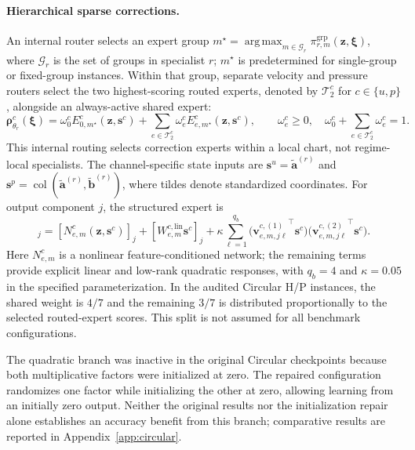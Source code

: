 \paragraph{Hierarchical sparse corrections.}
An internal router selects an expert group
$m^\star=\operatorname*{arg\,max}_{m\in\mathcal G_r}
\pi_{r,m}^{\mathrm{grp}}(\bm z,\bm\xi)$,
where $\mathcal G_r$ is the set of groups in specialist $r$;
$m^\star$ is predetermined for single-group or fixed-group instances.
Within that group, separate velocity and pressure routers select the
two highest-scoring routed experts, denoted by $\mathcal T_2^c$ for
$c\in\{u,p\}$, alongside an always-active shared expert:
\begin{equation}
  \bm\rho^c_{\theta_r}(\bm\xi)
  =\omega_0^c E_{0,m^\star}^c(\bm z,\bm s^c)
   +\sum_{e\in\mathcal T_2^c}
       \omega_e^c E_{e,m^\star}^c(\bm z,\bm s^c),
  \qquad
  \omega_e^c\geq0,\quad
  \omega_0^c+\sum_{e\in\mathcal T_2^c}\omega_e^c=1.
  \label{eq:main_inner_moe}
  \label{eq:app_channel_sparse_moe}
\end{equation}
This internal routing selects correction experts within a local chart,
not regime-local specialists. The channel-specific state inputs are
$\bm s^u=\widetilde{\bm a}^{(r)}$ and
$\bm s^p=\operatorname{col}(\widetilde{\bm a}^{(r)},
\widetilde{\bm b}^{(r)})$, where tildes denote standardized coordinates.
For output component $j$, the structured expert is
\begin{equation}
  [E_{e,m}^c(\bm z,\bm s^c)]_j
  =[N_{e,m}^c(\bm z,\bm s^c)]_j
   +[W_{e,m}^{c,\mathrm{lin}}\bm s^c]_j
   +\kappa\sum_{\ell=1}^{q_b}
     \bigl({\bm v_{e,m,j\ell}^{c,(1)}}^\top\bm s^c\bigr)
     \bigl({\bm v_{e,m,j\ell}^{c,(2)}}^\top\bm s^c\bigr).
  \label{eq:main_structured_expert}
\end{equation}
Here $N_{e,m}^c$ is a nonlinear feature-conditioned network; the
remaining terms provide explicit linear and low-rank quadratic
responses, with $q_b=4$ and $\kappa=0.05$ in the specified
parameterization. In the audited Circular H/P instances, the shared
weight is $4/7$ and the remaining $3/7$ is distributed proportionally
to the selected routed-expert scores. This split is not assumed for
all benchmark configurations.

The quadratic branch was inactive in the original Circular checkpoints
because both multiplicative factors were initialized at zero. The
repaired configuration randomizes one factor while initializing the
other at zero, allowing learning from an initially zero output.
Neither the original results nor the initialization repair alone
establishes an accuracy benefit from this branch; comparative results
are reported in Appendix~\ref{app:circular}.

